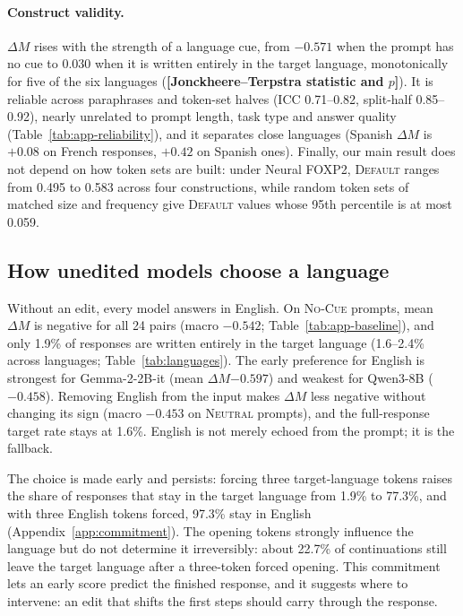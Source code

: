 \documentclass[11pt]{article}
\newif\ifauthornotes
\newcommand{\res}[1]{\textcolor{red!70!black}{\textbf{[#1]}}}
\newcommand{\finding}[1]{%
  \ifauthornotes\par\smallskip\noindent
  \fcolorbox{orange!80!black}{orange!6}{\parbox{\dimexpr\linewidth-2\fboxsep-2\fboxrule\relax}{%
  \scriptsize\sffamily\textbf{To write once results are in:} #1}}\par\smallskip\fi}
\newcommand{\foxp}{Neural FOXP2\xspace}
\newcommand{\dM}{\ensuremath{\Delta M}\xspace}
\newcommand{\default}{\textsc{Default}\xspace}
\newcommand{\nocue}{\textsc{No-Cue}\xspace}
\newcommand{\neutral}{\textsc{Neutral}\xspace}
\begin{document}
\paragraph{Construct validity.}
\dM rises with the strength of a language cue, from $-0.571$ when the prompt has no cue to $0.030$ when it is written entirely in the target language, monotonically for five of the six languages (\res{Jonckheere--Terpstra statistic and $p$}). It is reliable across paraphrases and token-set halves (ICC 0.71--0.82, split-half 0.85--0.92), nearly unrelated to prompt length, task type and answer quality (Table~\ref{tab:app-reliability}), and it separates close languages (Spanish \dM is $+0.08$ on French responses, $+0.42$ on Spanish ones). Finally, our main result does not depend on how token sets are built: under \foxp, \default ranges from 0.495 to 0.583 across four constructions, while random token sets of matched size and frequency give \default values whose 95th percentile is at most 0.059.

\subsection{How unedited models choose a language}
\label{subsec:baseline-behavior}

Without an edit, every model answers in English. On \nocue prompts, mean \dM is negative for all 24 pairs (macro $-0.542$; Table~\ref{tab:app-baseline}), and only 1.9\% of responses are written entirely in the target language (1.6--2.4\% across languages; Table~\ref{tab:languages}). The early preference for English is strongest for Gemma-2-2B-it (mean \dM $-0.597$) and weakest for Qwen3-8B ($-0.458$). Removing English from the input makes \dM less negative without changing its sign (macro $-0.453$ on \neutral prompts), and the full-response target rate stays at 1.6\%. English is not merely echoed from the prompt; it is the fallback.
\finding{A1: the \nocue rows of Table~\ref{tab:app-baseline}(b) and the \nocue cell rates of Figure~\ref{fig:baseline} came from a run that gives a 1.55\% macro and must be regenerated from Experiment~1 so that they average to 1.9\% (es 1.6, fr 1.9, zh 2.2, ru 1.8, hi 2.4, ar 1.7). The \neutral rows of the same table average 4.3\%, not the canonical 1.6\%; reconcile them too.}

The choice is made early and persists: forcing three target-language tokens raises the share of responses that stay in the target language from 1.9\% to 77.3\%, and with three English tokens forced, 97.3\% stay in English (Appendix~\ref{app:commitment}). The opening tokens strongly influence the language but do not determine it irreversibly: about 22.7\% of continuations still leave the target language after a three-token forced opening. This commitment lets an early score predict the finished response, and it suggests where to intervene: an edit that shifts the first steps should carry through the response.
\end{document}
